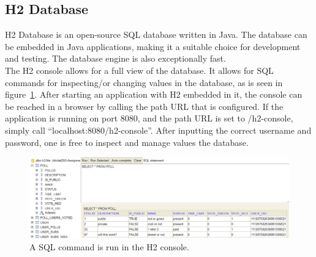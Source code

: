 \subsection{H2 Database}
\label{sub:h2db}
H2 Database is an open-source SQL database written in Java. The database can be embedded in Java applications, making it a suitable choice for development and testing. The database engine is also exceptionally fast. \cite{h2db} \\[\baselineskip]
The H2 console allows for a full view of the database. It allows for SQL commands for inspecting/or changing values in the database, as is seen in figure~\ref{fig:h2console}. After starting an application with H2 embedded in it, the console can be reached in a browser by calling the path URL that is configured. If the application is running on port 8080, and the path URL is set to /h2-console, \\simply call “localhost:8080/h2-console”. After inputting the correct username and password, one is free to inspect and manage values the database. 
\begin{figure}[H]
  \centering
  \includegraphics[scale=0.45]{figs/h2cons.png}
  \caption[scale=0.5]{A SQL command is run in the H2 console.}
  \label{fig:h2console}
\end{figure}